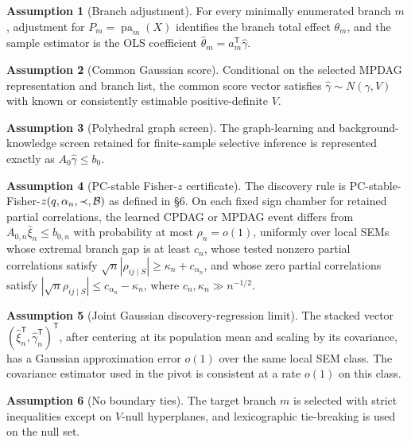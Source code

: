 \documentclass[11pt]{article}
\newcommand{\transpose}{\mathsf{T}}
\theoremstyle{definition}
\newtheorem{assumption}{Assumption}
\theoremstyle{plain}
\theoremstyle{remark}
\begin{document}
\begin{assumption}[Branch adjustment]\label{ass:branch-adjustment}
For every minimally enumerated branch \(m\), adjustment for \(P_m=\operatorname{pa}_m(X)\) identifies the branch total effect \(\theta_m\), and the sample estimator is the OLS coefficient \(\hat\theta_m=a_m^\transpose\hat\gamma\).
\end{assumption}

\begin{assumption}[Common Gaussian score]\label{ass:gaussian-score}
Conditional on the selected MPDAG representation and branch list, the common score vector satisfies \(\hat\gamma\sim N(\gamma,V)\) with known or consistently estimable positive-definite \(V\).
\end{assumption}

\begin{assumption}[Polyhedral graph screen]\label{ass:poly-screen}
The graph-learning and background-knowledge screen retained for finite-sample selective inference is represented exactly as \(A_0\hat\gamma\le b_0\).
\end{assumption}

\begin{assumption}[PC-stable Fisher-\(z\) certificate]\label{ass:asym-poly-screen}
The discovery rule is PC-stable-Fisher-\(z(q,\alpha_n,\prec,{\cal B})\) as defined in \S6. On each fixed sign chamber for retained partial correlations, the learned CPDAG or MPDAG event differs from \(A_{0,n}\hat\xi_n\le b_{0,n}\) with probability at most \(\rho_n=o(1)\), uniformly over local SEMs whose extremal branch gap is at least \(c_n\), whose tested nonzero partial correlations satisfy \(\sqrt n|\rho_{ij\mid S}|\ge \kappa_n+c_{\alpha_n}\), and whose zero partial correlations satisfy \(|\sqrt n\rho_{ij\mid S}|\le c_{\alpha_n}-\kappa_n\), where \(c_n,\kappa_n\gg n^{-1/2}\).
\end{assumption}

\begin{assumption}[Joint Gaussian discovery-regression limit]\label{ass:joint-limit}
The stacked vector \((\hat\xi_n^\transpose,\hat\gamma_n^\transpose)^\transpose\), after centering at its population mean and scaling by its covariance, has a Gaussian approximation error \(o(1)\) over the same local SEM class. The covariance estimator used in the pivot is consistent at a rate \(o(1)\) on this class.
\end{assumption}

\begin{assumption}[No boundary ties]\label{ass:no-ties}
The target branch \(m\) is selected with strict inequalities except on \(V\)-null hyperplanes, and lexicographic tie-breaking is used on the null set.
\end{assumption}
\end{document}
